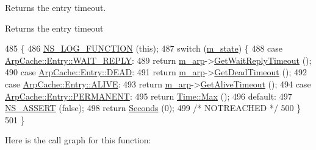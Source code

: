 Returns the entry timeout. 

\begin{DoxyReturn}{Returns}
the entry timeout 
\end{DoxyReturn}

\begin{DoxyCode}
485 \{
486   \hyperlink{log-macros-disabled_8h_a90b90d5bad1f39cb1b64923ea94c0761}{NS\_LOG\_FUNCTION} (\textcolor{keyword}{this});
487   \textcolor{keywordflow}{switch} (\hyperlink{classns3_1_1ArpCache_1_1Entry_adb18d4ee6f4b15415822c18296a68497}{m\_state}) \{
488     \textcolor{keywordflow}{case} \hyperlink{classns3_1_1ArpCache_1_1Entry_a95a2d5d357f7306cf73e9efe4758a2eaa3a9eb00501370df59685623607504f39}{ArpCache::Entry::WAIT\_REPLY}:
489       \textcolor{keywordflow}{return} \hyperlink{classns3_1_1ArpCache_1_1Entry_a0f8e4d6bcbc2f2c472c97f6118eaaaee}{m\_arp}->\hyperlink{classns3_1_1ArpCache_a0e83bb9568d72f3fa2d187a72b0abbc4}{GetWaitReplyTimeout} ();
490     \textcolor{keywordflow}{case} \hyperlink{classns3_1_1ArpCache_1_1Entry_a95a2d5d357f7306cf73e9efe4758a2eaaccc31bc07150997f175ffe1f59edcbb1}{ArpCache::Entry::DEAD}:
491       \textcolor{keywordflow}{return} \hyperlink{classns3_1_1ArpCache_1_1Entry_a0f8e4d6bcbc2f2c472c97f6118eaaaee}{m\_arp}->\hyperlink{classns3_1_1ArpCache_ad6b09c9735d13bb83f1a1f635b885cb9}{GetDeadTimeout} ();
492     \textcolor{keywordflow}{case} \hyperlink{classns3_1_1ArpCache_1_1Entry_a95a2d5d357f7306cf73e9efe4758a2eaa7c6e5cb295147783a7233a7ba4e52c38}{ArpCache::Entry::ALIVE}:
493       \textcolor{keywordflow}{return} \hyperlink{classns3_1_1ArpCache_1_1Entry_a0f8e4d6bcbc2f2c472c97f6118eaaaee}{m\_arp}->\hyperlink{classns3_1_1ArpCache_a78dc3f3db9c7fd5f8042efcc1dfff5e8}{GetAliveTimeout} ();
494     \textcolor{keywordflow}{case} \hyperlink{classns3_1_1ArpCache_1_1Entry_a95a2d5d357f7306cf73e9efe4758a2eaa91293cdddaff5ef5edb16633c2226592}{ArpCache::Entry::PERMANENT}:
495       \textcolor{keywordflow}{return} \hyperlink{classns3_1_1Time_ad3414eb47d40a34971d5e78db88cfc72}{Time::Max} ();
496     \textcolor{keywordflow}{default}:
497       \hyperlink{assert_8h_a6dccdb0de9b252f60088ce281c49d052}{NS\_ASSERT} (\textcolor{keyword}{false});
498       \textcolor{keywordflow}{return} \hyperlink{group__timecivil_ga33c34b816f8ff6628e33d5c8e9713b9e}{Seconds} (0);
499       \textcolor{comment}{/* NOTREACHED */}
500     \}
501 \}
\end{DoxyCode}


Here is the call graph for this function\+:




